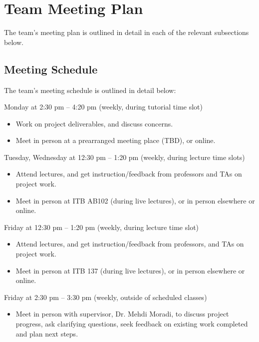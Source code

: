 \documentclass{article}
\begin{document}
\section{Team Meeting Plan}

The team's meeting plan is outlined in detail in each of the relevant subsections below.

\subsection{Meeting Schedule}

The team's meeting schedule is outlined in detail below:

\begin{itemize}
\begin{item}
Monday at 2:30 pm – 4:20 pm (weekly, during tutorial time slot)
\begin{itemize}
\item Work on project deliverables, and discuss concerns.
\item Meet in person at a prearranged meeting place (TBD), or online.
\end{itemize}
\end{item}
\begin{item}
Tuesday, Wednesday at 12:30 pm – 1:20 pm (weekly, during lecture time slots)
\begin{itemize}
\item Attend lectures, and get instruction/feedback from professors and TAs on project work.
\item Meet in person at ITB AB102 (during live lectures), or in person elsewhere or online.
\end{itemize}
\end{item}
\begin{item}
Friday at 12:30 pm – 1:20 pm (weekly, during lecture time slot)
\begin{itemize}
\item Attend lectures, and get instruction/feedback from professors, and TAs on project work.
\item Meet in person at ITB 137 (during live lectures), or in person elsewhere or online.
\end{itemize}
\end{item}
\begin{item}
Friday at 2:30 pm – 3:30 pm (weekly, outside of scheduled classes)
\begin{itemize}
\item Meet in person with supervisor, Dr. Mehdi Moradi, to discuss project progress, ask clarifying questions, seek feedback on existing work completed and plan next steps.
\end{itemize}
\end{item}
\end{itemize}
\end{document}
